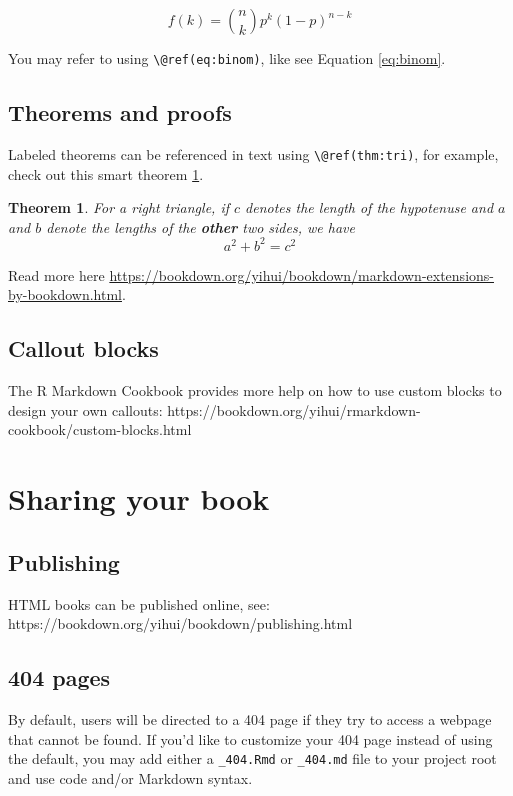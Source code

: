 \documentclass[
  french,
]{book}
\newtheorem{theorem}{Theorem}[chapter]
\theoremstyle{definition}
\theoremstyle{definition}
\theoremstyle{definition}
\theoremstyle{definition}
\theoremstyle{remark}
\begin{document}
\begin{equation} 
  f\left(k\right) = \binom{n}{k} p^k\left(1-p\right)^{n-k}
  \label{eq:binom}
\end{equation}

You may refer to using \texttt{\textbackslash{}@ref(eq:binom)}, like see Equation \eqref{eq:binom}.

\section{Theorems and proofs}

Labeled theorems can be referenced in text using \texttt{\textbackslash{}@ref(thm:tri)}, for example, check out this smart theorem \ref{thm:tri}.

\begin{theorem}
\protect\hypertarget{thm:tri}{}\label{thm:tri}For a right triangle, if \(c\) denotes the \emph{length} of the hypotenuse
and \(a\) and \(b\) denote the lengths of the \textbf{other} two sides, we have
\[a^2 + b^2 = c^2\]
\end{theorem}

Read more here \url{https://bookdown.org/yihui/bookdown/markdown-extensions-by-bookdown.html}.

\section{Callout blocks}

The R Markdown Cookbook provides more help on how to use custom blocks to design your own callouts: https://bookdown.org/yihui/rmarkdown-cookbook/custom-blocks.html

\chapter{Sharing your book}

\section{Publishing}

HTML books can be published online, see: https://bookdown.org/yihui/bookdown/publishing.html

\section{404 pages}

By default, users will be directed to a 404 page if they try to access a webpage that cannot be found. If you'd like to customize your 404 page instead of using the default, you may add either a \texttt{\_404.Rmd} or \texttt{\_404.md} file to your project root and use code and/or Markdown syntax.
\end{document}
